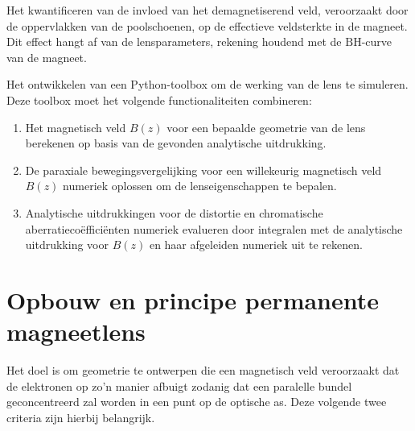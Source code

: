 \documentclass[we,twoside,openright,a4paper,11pt]{uantwerpenbamathesis}
\begin{document}
\begin{tcolorbox}[colback=red!10!white,colframe=red!75!white,title=Objectief 3]
    Het kwantificeren van de invloed van het demagnetiserend veld, veroorzaakt door de oppervlakken van de poolschoenen, op de effectieve veldsterkte in de magneet. Dit effect hangt af van de lensparameters, rekening houdend met de $\mathrm{BH}$-curve van de magneet.
\end{tcolorbox}

\begin{tcolorbox}[colback=red!10!white,colframe=red!75!white,title=Objectief 4]
    Het ontwikkelen van een Python-toolbox om de werking van de lens te simuleren. Deze toolbox moet het volgende functionaliteiten combineren:
    \begin{enumerate}
        \item Het magnetisch veld $B(z)$ voor een bepaalde geometrie van de lens berekenen op basis van de gevonden analytische uitdrukking.
        \item De paraxiale bewegingsvergelijking voor een willekeurig magnetisch veld $B(z)$ numeriek oplossen om de lenseigenschappen te bepalen.
        \item Analytische uitdrukkingen voor de distortie en chromatische aberratiecoëfficiënten numeriek evalueren door integralen met de analytische uitdrukking voor $B(z)$ en haar afgeleiden numeriek uit te rekenen.
    \end{enumerate}
\end{tcolorbox}

\section{Opbouw en principe permanente magneetlens}
Het doel is om geometrie te ontwerpen die een magnetisch veld veroorzaakt dat de elektronen op zo'n manier afbuigt zodanig dat een paralelle bundel geconcentreerd zal worden in een punt op de optische as. Deze volgende twee criteria zijn hierbij belangrijk.\\
\end{document}
